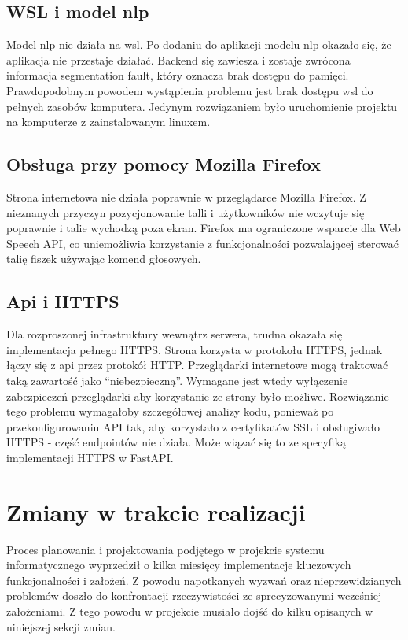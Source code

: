 \subsection{WSL i model nlp}
Model nlp nie działa na wsl. Po dodaniu do aplikacji modelu nlp okazało się, że aplikacja nie przestaje działać. Backend się zawiesza i zostaje zwrócona informacja segmentation fault, który oznacza brak dostępu do pamięci. Prawdopodobnym powodem wystąpienia problemu jest brak dostępu wsl do pełnych zasobów komputera. Jedynym rozwiązaniem było uruchomienie projektu na komputerze z zainstalowanym linuxem.

\subsection{Obsługa przy pomocy Mozilla Firefox}
Strona internetowa nie działa poprawnie w przeglądarce Mozilla Firefox. Z nieznanych przyczyn pozycjonowanie talli i użytkowników nie wczytuje się poprawnie i talie wychodzą poza ekran. Firefox ma ograniczone wsparcie dla Web Speech API,  co uniemożliwia korzystanie z funkcjonalności pozwalającej sterować talię fiszek używając komend głosowych.

\subsection{Api i HTTPS}
Dla rozproszonej infrastruktury wewnątrz serwera, trudna okazała się implementacja pełnego HTTPS. Strona korzysta w protokołu HTTPS, jednak łączy się z api przez protokół HTTP. Przeglądarki internetowe mogą traktować taką zawartość jako “niebezpieczną”. Wymagane jest wtedy wyłączenie zabezpieczeń przeglądarki aby korzystanie ze strony było możliwe. Rozwiązanie tego problemu wymagałoby szczegółowej analizy kodu, ponieważ po przekonfigurowaniu API tak, aby korzystało z certyfikatów SSL i obsługiwało HTTPS - część endpointów nie działa. Może wiązać się to ze specyfiką implementacji HTTPS w FastAPI.


\section{Zmiany w trakcie realizacji}
Proces planowania i projektowania podjętego w projekcie systemu informatycznego wyprzedził o kilka miesięcy implementacje kluczowych funkcjonalności i założeń. Z powodu napotkanych wyzwań oraz nieprzewidzianych problemów doszło do konfrontacji rzeczywistości ze sprecyzowanymi wcześniej założeniami. Z tego powodu w projekcie musiało dojść do kilku opisanych w niniejszej sekcji zmian.

